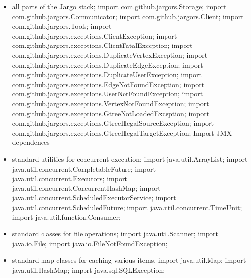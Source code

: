 \begin{itemize}
\item all parts of the Jargo stack;
\nwenddocs{}\plusendmoddef
import com.github.jargors.Storage;
import com.github.jargors.Communicator;
import com.github.jargors.Client;
import com.github.jargors.Tools;
import com.github.jargors.exceptions.ClientException;
import com.github.jargors.exceptions.ClientFatalException;
import com.github.jargors.exceptions.DuplicateVertexException;
import com.github.jargors.exceptions.DuplicateEdgeException;
import com.github.jargors.exceptions.DuplicateUserException;
import com.github.jargors.exceptions.EdgeNotFoundException;
import com.github.jargors.exceptions.UserNotFoundException;
import com.github.jargors.exceptions.VertexNotFoundException;
import com.github.jargors.exceptions.GtreeNotLoadedException;
import com.github.jargors.exceptions.GtreeIllegalSourceException;
import com.github.jargors.exceptions.GtreeIllegalTargetException;
\LA{}Import JMX dependences~{\nwtagstyle{}}\RA{}
\nwendcode{}\item standard utilities for concurrent execution;
\nwenddocs{}\plusendmoddef
import java.util.ArrayList;
import java.util.concurrent.CompletableFuture;
import java.util.concurrent.Executors;
import java.util.concurrent.ConcurrentHashMap;
import java.util.concurrent.ScheduledExecutorService;
import java.util.concurrent.ScheduledFuture;
import java.util.concurrent.TimeUnit;
import java.util.function.Consumer;
\nwendcode{}\item standard classes for file operations;
\nwenddocs{}\plusendmoddef
import java.util.Scanner;
import java.io.File;
import java.io.FileNotFoundException;
\nwendcode{}\item standard map classes for caching various items.
\nwenddocs{}\plusendmoddef
import java.util.Map;
import java.util.HashMap;
\nwendcode{}\nwdocspar
\nwenddocs{}\plusendmoddef
import java.sql.SQLException;
\nwendcode{}\nwdocspar
\end{itemize}

